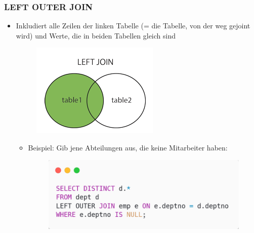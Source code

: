 \subsubsection{LEFT OUTER JOIN}
\begin{itemize}
    \item Inkludiert alle Zeilen der linken Tabelle (= die Tabelle, von der weg gejoint wird) und Werte, die in beiden Tabellen gleich sind
    \begin{figure}[H]
        \centering
        \includegraphics{res/themenkorb_2/joins_left_outer_join.png} 
    \end{figure}
    \begin{itemize}
        \item Beispiel: Gib jene Abteilungen aus, die keine Mitarbeiter haben:
        \begin{figure}[H]
            \centering 
            \includegraphics[scale=.45]{res/themenkorb_2/joins_left_outer_join_example.png}
        \end{figure}
    \end{itemize}
\end{itemize}


